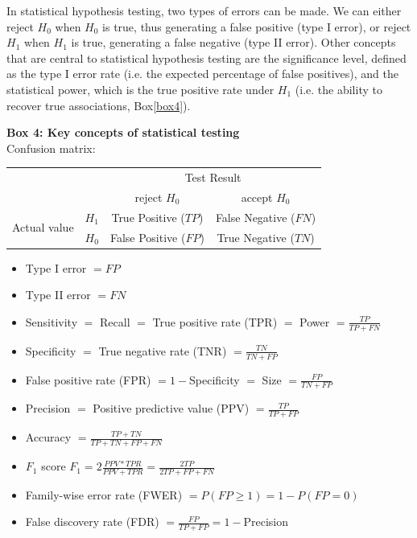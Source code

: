 In statistical hypothesis testing, two types of errors can be made. 
We can either reject $H_0$ when $H_0$ is true, thus generating a false positive (type I error), or reject $H_1$ when $H_1$ is true, generating a false negative (type II error).
Other concepts that are central to statistical hypothesis testing are the significance level, defined as the type I error rate (i.e. the expected percentage of false positives), and the statistical power, which is the true positive rate under $H_1$ (i.e. the ability to recover true associations, Box\ref{box4}).


\newpage

\begin{Comment}
\hspace{-2.5mm}\textbf{Box 4: Key concepts of statistical testing}\label{box4}\\
Confusion matrix:

\begin{center}
\begin{tabular}{l|l|c|c|}
\multicolumn{2}{c}{}&\multicolumn{2}{c}{Test Result}\\
\cline{3-4}
\multicolumn{2}{c|}{}&reject $H_0$&accept $H_0$\\
\cline{2-4}
\multirow{2}{*}{Actual value}& $H_1$ & True Positive ($TP$) & False Negative ($FN$)\\
\cline{2-4}
& $H_0$ & False Positive ($FP$) & True Negative ($TN$)\\
\cline{2-4}
\end{tabular}
\end{center}

\begin{itemize}
    \item Type I error $= FP$
    \item Type II error $= FN$
    \item Sensitivity $=$ Recall $=$ True positive rate (TPR) $=$ Power $=\frac{TP}{TP+FN}$
    \item Specificity $=$ True negative rate (TNR) $=\frac{TN}{TN+FP}$
    \item False positive rate (FPR) $= 1-$Specificity $=$ Size $=\frac{FP}{TN+FP}$
    \item Precision $=$ Positive predictive value (PPV) $=\frac{TP}{TP+FP}$
    \item Accuracy $=\frac{TP+TN}{TP+TN+FP+FN}$
    \item $F_1$ score $F_1=2 \frac{PPV*TPR}{PPV+TPR}=\frac{2TP}{2TP+FP+FN}$
    \item Family-wise error rate (FWER) $=P(FP \geq 1)= 1 - P(FP=0)$
    \item False discovery rate (FDR) $=\frac{FP}{TP+FP}= 1- $Precision
\end{itemize}

\vfill

\end{Comment}

